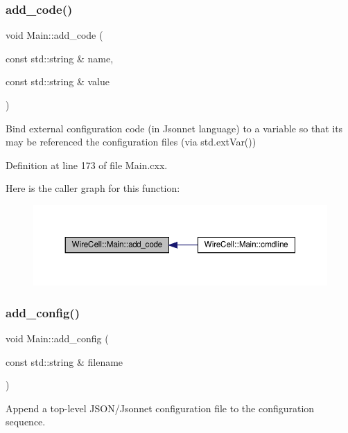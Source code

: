 \subsubsection{\texorpdfstring{add\+\_\+code()}{add\_code()}}
{\footnotesize\ttfamily void Main\+::add\+\_\+code (\begin{DoxyParamCaption}\item[{const std\+::string \&}]{name,  }\item[{const std\+::string \&}]{value }\end{DoxyParamCaption})}

Bind external configuration code (in Jsonnet language) to a variable so that its may be referenced the configuration files (via std.\+ext\+Var()) 

Definition at line 173 of file Main.\+cxx.

Here is the caller graph for this function\+:
\nopagebreak
\begin{figure}[H]
\begin{center}
\leavevmode
\includegraphics[width=350pt]{class_wire_cell_1_1_main_aed27a7aa4fcf7fc4bb03637bc226f318_icgraph}
\end{center}
\end{figure}
\mbox{\label{class_wire_cell_1_1_main_a9c790104cfb1a5223d041dd10187d2e2}} 
\subsubsection{\texorpdfstring{add\+\_\+config()}{add\_config()}}
{\footnotesize\ttfamily void Main\+::add\+\_\+config (\begin{DoxyParamCaption}\item[{const std\+::string \&}]{filename }\end{DoxyParamCaption})}

Append a top-\/level J\+S\+O\+N/\+Jsonnet configuration file to the configuration sequence. 

